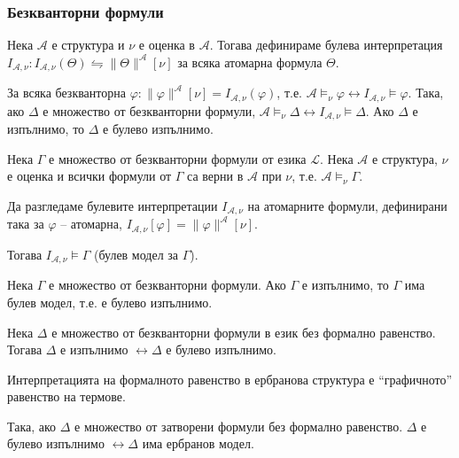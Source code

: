 \documentclass{article}
\begin{document}
\subsubsection*{Безкванторни формули}

\begin{claim}
Нека $\mathcal{A}$ е структура и $\nu$ е оценка в $\mathcal{A}$. Тогава дефинираме булева интерпретация $I_{\mathcal{A},\nu}: I_{\mathcal{A},\nu}(\Theta) \leftrightharpoons \|\Theta\|^\mathcal{A}[\nu]$ за всяка атомарна формула $\Theta$. 

За всяка безкванторна $\varphi: \|\varphi\|^\mathcal{A}[\nu] = I_{\mathcal{A},\nu}(\varphi)$, т.е. $ \mathcal{A} \models_\nu \varphi \longleftrightarrow I_{\mathcal{A}, \nu} \models \varphi$. Така, ако $\Delta$ е множество от безкванторни формули, $\mathcal{A} \models_\nu \Delta \longleftrightarrow I_{\mathcal{A}, \nu} \models \Delta$. Ако $\Delta$ е изпълнимо, то $\Delta$ е булево изпълнимо.
\end{claim}

\begin{claim}
Нека $\Gamma$ е множество от безкванторни формули от езика $\mathcal{L}$. Нека $\mathcal{A}$ е структура, $\nu$ е оценка и всички формули от $\Gamma$ са верни в $\mathcal{A}$ при $\nu$, т.е. $\mathcal{A} \models_\nu \Gamma$.

Да разгледаме булевите интерпретации $I_{\mathcal{A},\nu}$ на атомарните формули, дефинирани така за $\varphi$ -- атомарна, $I_{\mathcal{A}, \nu}[\varphi] = \|\varphi\|^\mathcal{A}[\nu]$.

Тогава $I_{\mathcal{A}, \nu} \models \Gamma$ (булев модел за $\Gamma$).

\setcounter{conseq}{0}
\begin{conseq}
Нека $\Gamma$ е множество от безкванторни формули. Ако $\Gamma$ е изпълнимо, то $\Gamma$ има булев модел, т.е. е булево изпълнимо.
\end{conseq}

\end{claim}

\begin{claim}
Нека $\Delta$ е множество от безкванторни формули в език без формално равенство. Тогава $\Delta$ е изпълнимо $\longleftrightarrow \Delta$  е булево изпълнимо.

\begin{remark}
Интерпретацията на формалното равенство в ербранова структура е ``графичното'' равенство на термове.

Така, ако $\Delta$ е множество от затворени формули без формално равенство. $\Delta$ е булево изпълнимо $\longleftrightarrow \Delta$ има ербранов модел.
\end{remark}
\end{claim}
\end{document}
